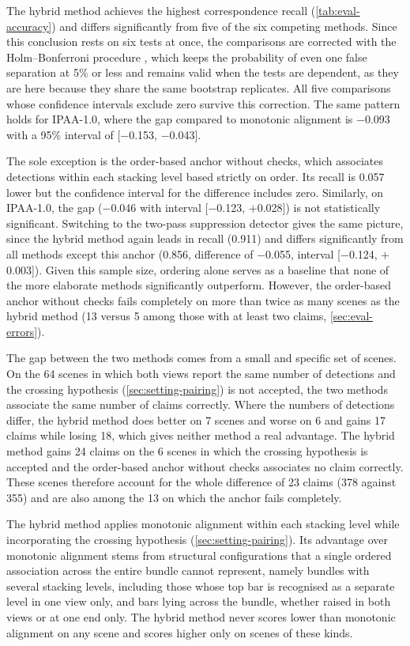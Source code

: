 \documentclass[a4paper, 12pt, twoside]{book}
\newcommand{\citev}[1]{\citeauthor{#1} \citeyear{#1} \cite{#1}}
\begin{document}
The hybrid method achieves the highest correspondence recall (\cref{tab:eval-accuracy}) and differs significantly from five of the six competing methods. Since this conclusion rests on six tests at once, the comparisons are corrected with the Holm--Bonferroni procedure \citev{holm1979}, which keeps the probability of even one false separation at 5\% or less and remains valid when the tests are dependent, as they are here because they share the same bootstrap replicates. All five comparisons whose confidence intervals exclude zero survive this correction. The same pattern holds for IPAA-1.0, where the gap compared to monotonic alignment is $-$0.093 with a 95\% interval of [$-$0.153, $-$0.043].

The sole exception is the order-based anchor without checks, which associates detections within each stacking level based strictly on order. Its recall is 0.057 lower but the confidence interval for the difference includes zero. Similarly, on IPAA-1.0, the gap ($-$0.046 with interval [$-$0.123, $+$0.028]) is not statistically significant. Switching to the two-pass suppression detector gives the same picture, since the hybrid method again leads in recall (0.911) and differs significantly from all methods except this anchor (0.856, difference of $-$0.055, interval [$-$0.124, $+$0.003]). Given this sample size, ordering alone serves as a baseline that none of the more elaborate methods significantly outperform. However, the order-based anchor without checks fails completely on more than twice as many scenes as the hybrid method (13 versus 5 among those with at least two claims, \cref{sec:eval-errors}).

The gap between the two methods comes from a small and specific set of scenes. On the 64 scenes in which both views report the same number of detections and the crossing hypothesis (\cref{sec:setting-pairing}) is not accepted, the two methods associate the same number of claims correctly. Where the numbers of detections differ, the hybrid method does better on 7 scenes and worse on 6 and gains 17 claims while losing 18, which gives neither method a real advantage. The hybrid method gains 24 claims on the 6 scenes in which the crossing hypothesis is accepted and the order-based anchor without checks associates no claim correctly. These scenes therefore account for the whole difference of 23 claims (378 against 355) and are also among the 13 on which the anchor fails completely.

The hybrid method applies monotonic alignment within each stacking level while incorporating the crossing hypothesis (\cref{sec:setting-pairing}). Its advantage over monotonic alignment stems from structural configurations that a single ordered association across the entire bundle cannot represent, namely bundles with several stacking levels, including those whose top bar is recognised as a separate level in one view only, and bars lying across the bundle, whether raised in both views or at one end only. The hybrid method never scores lower than monotonic alignment on any scene and scores higher only on scenes of these kinds.
\end{document}
